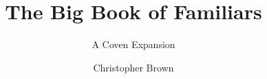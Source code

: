 \documentclass[a4paper,10pt,twocolumn]{memoir}
\title{The Big Book of Familiars}
\subtitle{A Coven Expansion}
\author{Christopher Brown}
\begin{document}
\frontmatter

\titlepage



\tableofcontents*

\mainmatter



\backmatter

\printindex
\end{document}

